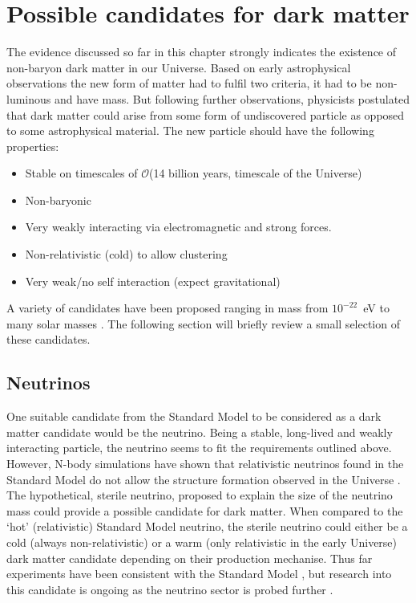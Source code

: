 \section{Possible candidates for dark matter}\label{sec:DMOverview/Candidates4DM}
The evidence discussed so far in this chapter strongly indicates the existence of non-baryon dark matter in our Universe. Based on early astrophysical observations the new form of matter had to fulfil two criteria, it had to be non-luminous and have mass. But following further observations, physicists postulated that dark matter could arise from some form of undiscovered particle as opposed to some astrophysical material. The new particle should have the following properties:
\begin{itemize}
    \item Stable on timescales of $\mathcal{O}$(14 billion years, timescale of the Universe)
    \item Non-baryonic
    \item Very weakly interacting via electromagnetic and strong forces.
    \item Non-relativistic (cold) to allow clustering
    \item Very weak/no self interaction (expect gravitational)
\end{itemize}
A variety of candidates have been proposed ranging in mass from $10^{-22}$~eV to many solar masses \cite{DMPrimer}. The following section will briefly review a small selection of these candidates.
\subsection{Neutrinos}\label{sec:DMOverview/Neutrinos}
One suitable candidate from the Standard Model to be considered as a dark matter candidate would be the neutrino. Being a stable, long-lived and weakly interacting particle, the neutrino seems to fit the requirements outlined above. However, N-body simulations have shown that relativistic neutrinos found in the Standard Model do not allow the structure formation observed in the Universe \cite{White:1983fcs}. The hypothetical, sterile neutrino, proposed to explain the size of the neutrino mass could provide a possible candidate for dark matter. When compared to the `hot' (relativistic) Standard Model neutrino, the sterile neutrino could either be a cold (always non-relativistic) or a warm (only relativistic in the early Universe) dark matter candidate depending on their production mechanise. Thus far experiments have been consistent with the Standard Model \cite{Boyarsky:2018tvu}, but research into this candidate is ongoing as the neutrino sector is probed further \cite{Krasnov:2019kdc}.
